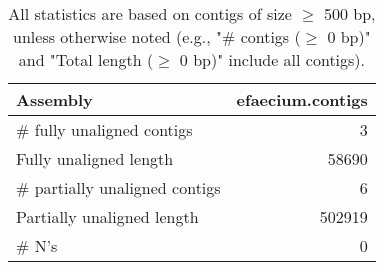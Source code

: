 \documentclass[12pt,a4paper]{article}
\begin{document}
\begin{table}[ht]
\begin{center}
\caption{All statistics are based on contigs of size $\geq$ 500 bp, unless otherwise noted (e.g., "\# contigs ($\geq$ 0 bp)" and "Total length ($\geq$ 0 bp)" include all contigs).}
\begin{tabular}{|l*{1}{|r}|}
\hline
Assembly & efaecium.contigs \\ \hline
\# fully unaligned contigs & 3 \\ \hline
Fully unaligned length & 58690 \\ \hline
\# partially unaligned contigs & 6 \\ \hline
Partially unaligned length & 502919 \\ \hline
\# N's & 0 \\ \hline
\end{tabular}
\end{center}
\end{table}
\end{document}
